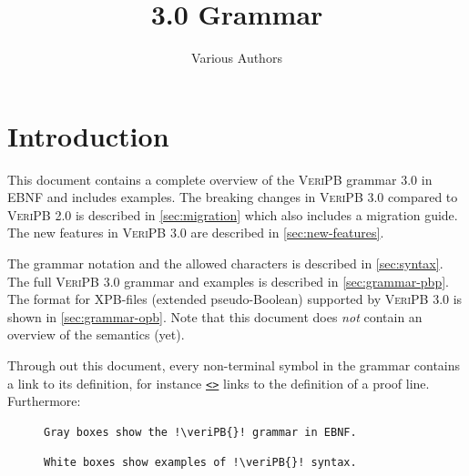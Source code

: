 \documentclass[a4paper]{article}
\title{\veriPB{} 3.0 Grammar}
\author{Various Authors}
\newcommand{\lnkBNF}[1]{\hyperlink{def:#1}{<\detokenize{#1}>}}
\newcommand{\veriPB}[0]{\textsc{VeriPB}}
\begin{document}
\maketitle

\tableofcontents

\section{Introduction}\label{sec:introduction}
This document contains a complete overview of the \veriPB{} grammar 3.0 in EBNF and includes examples. The breaking changes in \veriPB{} 3.0 compared to \veriPB{} 2.0 is described in \autoref{sec:migration} which also includes a migration guide. The new features in \veriPB{} 3.0 are described in \autoref{sec:new-features}.

The grammar notation and the allowed characters is described in \autoref{sec:syntax}. The full \veriPB{} 3.0 grammar and examples is described in \autoref{sec:grammar-pbp}. The format for XPB-files (extended pseudo-Boolean) supported by \veriPB{} 3.0 is shown in \autoref{sec:grammar-opb}. Note that this document does \emph{not} contain an overview of the semantics (yet).

Through out this document, every non-terminal symbol in the grammar contains a link to its definition, for instance \texttt{\lnkBNF{proof_line}} links to the definition of a proof line. Furthermore:
\begin{figure}[H]
	\begin{minipage}{.49\linewidth}
		\begin{lstlisting}[gobble=8]
		Gray boxes show the !\veriPB{}! grammar in EBNF.
		\end{lstlisting}
	\end{minipage}\hfill%
	\begin{minipage}{.49\linewidth}
		\begin{lstlisting}[backgroundcolor=\color{veripb-background}, gobble=8]
		White boxes show examples of !\veriPB{}! syntax.
		\end{lstlisting}
	\end{minipage}
\end{figure}
\end{document}
